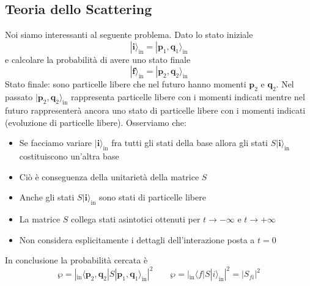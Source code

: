 \subsection{Teoria dello Scattering}
Noi siamo interessanti al seguente problema. Dato lo stato iniziale
$$
|\mathbf{i}\rangle_\text{in}=|\mathbf{p}_1,\mathbf{q}_1\rangle_{\text{in}}
$$
e calcolare la probabilità di avere uno stato finale
$$
|\mathbf{f}\rangle_\text{in}=|\mathbf{p}_2,\mathbf{q}_2\rangle_{\text{in}}
$$
Stato finale: sono particelle libere che nel futuro hanno momenti $\mathbf{p}_2$ e $\mathbf{q}_2$. Nel passato $|\mathbf{p}_2,\mathbf{q}_2\rangle_{\text{in}}$ rappresenta particelle libere con i momenti indicati mentre nel futuro rappresenterà ancora uno stato di particelle libere con i momenti indicati (evoluzione di particelle libere). Osserviamo che:
\begin{itemize}
    \item Se facciamo variare $|\mathbf{i}\rangle_\text{in}$ fra tutti gli stati della base allora gli stati $S|\mathbf{i}\rangle_\text{in}$ costituiscono un'altra base
    \item Ciò è conseguenza della unitarietà della matrice $S$
    \item Anche gli stati $S|\mathbf{i}\rangle_\text{in}$ sono stati di particelle libere
    \item La matrice $S$ collega stati asintotici ottenuti per $t\to-\infty$ e $t\to+\infty$
    \item Non considera esplicitamente i dettagli dell'interazione posta a $t=0$
\end{itemize}
In conclusione la probabilità cercata è
$$
\wp = | {}_{\text{in}}\langle \mathbf{p}_2, \mathbf{q}_2 | S | \mathbf{p}_1, \mathbf{q}_1 \rangle_{\text{in}} |^2 \qquad \wp = | {}_{\text{in}}\langle f | S | i \rangle_{\text{in}} |^2 = |S_{fi}|^2
$$
